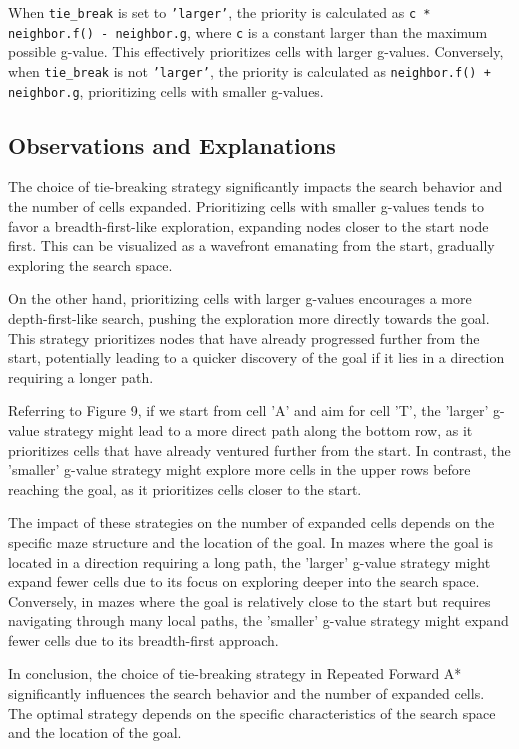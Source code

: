 \documentclass[12pt]{article}
\begin{document}
When \texttt{tie\_break} is set to \texttt{'larger'}, the priority is calculated as  \texttt{c * neighbor.f() - neighbor.g}, where \texttt{c} is a constant larger than the maximum possible g-value. This effectively prioritizes cells with larger g-values. Conversely, when \texttt{tie\_break} is not \texttt{'larger'}, the priority is calculated as \texttt{neighbor.f() + neighbor.g}, prioritizing cells with smaller g-values.

\subsection{Observations and Explanations}

The choice of tie-breaking strategy significantly impacts the search behavior and the number of cells expanded. Prioritizing cells with smaller g-values tends to favor a breadth-first-like exploration, expanding nodes closer to the start node first. This can be visualized as a wavefront emanating from the start, gradually exploring the search space.

On the other hand, prioritizing cells with larger g-values encourages a more depth-first-like search, pushing the exploration more directly towards the goal. This strategy prioritizes nodes that have already progressed further from the start, potentially leading to a quicker discovery of the goal if it lies in a direction requiring a longer path.

Referring to Figure 9, if we start from cell 'A' and aim for cell 'T', the 'larger' g-value strategy might lead to a more direct path along the bottom row, as it prioritizes cells that have already ventured further from the start. In contrast, the 'smaller' g-value strategy might explore more cells in the upper rows before reaching the goal, as it prioritizes cells closer to the start.

The impact of these strategies on the number of expanded cells depends on the specific maze structure and the location of the goal. In mazes where the goal is located in a direction requiring a long path, the 'larger' g-value strategy might expand fewer cells due to its focus on exploring deeper into the search space. Conversely, in mazes where the goal is relatively close to the start but requires navigating through many local paths, the 'smaller' g-value strategy might expand fewer cells due to its breadth-first approach.

In conclusion, the choice of tie-breaking strategy in Repeated Forward A* significantly influences the search behavior and the number of expanded cells. The optimal strategy depends on the specific characteristics of the search space and the location of the goal.
\end{document}
